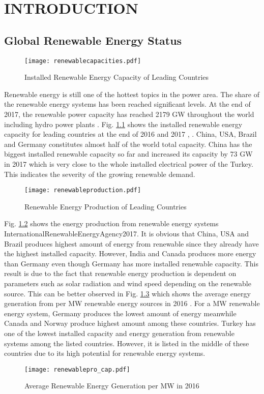 \chapter{INTRODUCTION}
\label{chp:1}
\section{Global Renewable Energy Status}
\begin{figure}[h]
	\centering
	\texttt{[image: renewablecapacities.pdf]}
	\caption{Installed Renewable Energy Capacity of Leading Countries}
	\label{renewablecap}
\end{figure}
Renewable energy is still one of the hottest topics in the power area. The share of the renewable energy systems has been reached significant levels. At the end of 2017, the renewable power capacity has reached 2179 GW throughout the world including hydro power plants \cite{InternationalRenewableEnergyAgencyIRENA2018}. Fig. \ref{renewablecap} shows the installed renewable energy capacity for leading countries at the end of 2016 and 2017 \cite{InternationalRenewableEnergyAgency2017}, \cite{InternationalRenewableEnergyAgencyIRENA2018}. China, USA, Brazil and Germany constitutes almost half of the world total capacity. China has the biggest installed renewable capacity so far and increased its capacity by 73 GW in 2017 which is very close to the whole installed electrical power of the Turkey. This indicates the severity of the growing renewable demand.\par
\begin{figure}[h]
	\centering
	\texttt{[image: renewableproduction.pdf]}
	\caption{Renewable Energy Production of Leading Countries}
	\label{renewablepro}
\end{figure}
Fig. \ref{renewablepro} shows the energy production from renewable energy  systems {InternationalRenewableEnergyAgency2017}. It is obvious that China, USA and Brazil produces highest amount of energy from renewable since they already have the highest installed capacity. However, India and Canada produces more energy than Germany even though Germany has more installed renewable capacity. This result is due to the fact that renewable energy production is dependent on parameters such as solar radiation and wind speed depending on the renewable source. This can be better observed in Fig. \ref{production/capacity} which shows the average energy generation from per MW renewable energy sources  in 2016 \cite{InternationalRenewableEnergyAgency2017}. For a MW renewable energy system, Germany produces the lowest amount of energy meanwhile Canada and Norway produce highest amount among these countries. Turkey has one of the lowest installed capacity and energy generation from renewable systems among the listed countries. However, it is listed in the middle of these countries due to its high potential for renewable energy systems.
\begin{figure}[h!]
	\centering
	\texttt{[image: renewablepro\_cap.pdf]}
	\caption{Average Renewable Energy Generation per MW in 2016}
	\label{production/capacity}
\end{figure}
